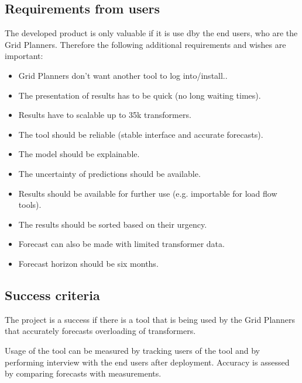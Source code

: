 \documentclass[letterpaper,10pt,english]{sphinxmanual}
\begin{document}
\subsection{Requirements from users}
\label{\detokenize{business_understanding:requirements-from-users}}
The developed product is only valuable if it is use dby the end users, who are the Grid Planners.
Therefore the following additional requirements and wishes are important:
\begin{itemize}
\item {} 
Grid Planners don’t want another tool to log into/install..

\item {} 
The presentation of results has to be quick (no long waiting times).

\item {} 
Results have to scalable up to 35k transformers.

\item {} 
The tool should be reliable (stable interface and accurate forecasts).

\item {} 
The model should be explainable.

\item {} 
The uncertainty of predictions should be available.

\item {} 
Results should be available for further use (e.g. importable for load flow tools).

\item {} 
The results should be sorted based on their urgency.

\item {} 
Forecast can also be made with limited transformer data.

\item {} 
Forecast horizon should be six months.

\end{itemize}


\subsection{Success criteria}
\label{\detokenize{business_understanding:success-criteria}}
The project is a success if there is a tool that is being used by the Grid Planners that accurately forecasts overloading of transformers.

Usage of the tool can be measured by tracking users of the tool and by performing interview with the end users after deployment.
Accuracy is assessed by comparing forecasts with measurements.
\end{document}
